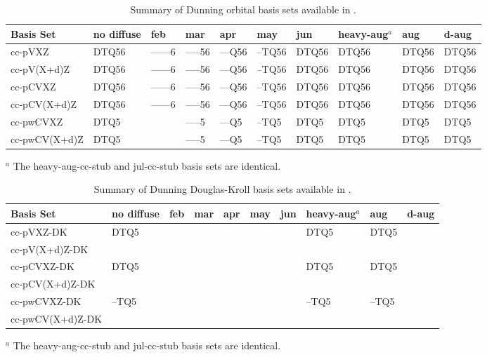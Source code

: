 \begin{table}[!htbp]
\begin{footnotesize}
\caption{Summary of Dunning orbital basis sets available in \PSIfour.} \label{table:basisDunningOrbital}
\parsep 10pt
\begin{center}
\begin{tabular}{llllllllll} 
\hline\hline
Basis Set            & no diffuse & feb & mar & apr & may & jun & heavy-aug$^a$ & aug & d-aug \\
\hline
cc-pVXZ              & DTQ56 & --{}--{}--{}--6 & --{}--{}--56 & --{}--Q56 & --TQ56 & DTQ56 & DTQ56 & DTQ56 & DTQ56 \\
cc-pV(X+d)Z          & DTQ56 & --{}--{}--{}--6 & --{}--{}--56 & --{}--Q56 & --TQ56 & DTQ56 & DTQ56 & DTQ56 & DTQ56 \\
cc-pCVXZ             & DTQ56 & --{}--{}--{}--6 & --{}--{}--56 & --{}--Q56 & --TQ56 & DTQ56 & DTQ56 & DTQ56 & DTQ56 \\
cc-pCV(X+d)Z         & DTQ56 & --{}--{}--{}--6 & --{}--{}--56 & --{}--Q56 & --TQ56 & DTQ56 & DTQ56 & DTQ56 & DTQ56 \\
cc-pwCVXZ            & DTQ5  &                 & --{}--{}--5  & --{}--Q5  & --TQ5  & DTQ5  & DTQ5  & DTQ5  & DTQ5  \\
cc-pwCV(X+d)Z        & DTQ5  &                 & --{}--{}--5  & --{}--Q5  & --TQ5  & DTQ5  & DTQ5  & DTQ5  & DTQ5  \\
\hline\hline
\end{tabular}
\end{center}
$^a$ The heavy-aug-cc-stub and jul-cc-stub basis sets are identical.
\end{footnotesize}
\end{table}


\begin{table}[!htbp]
\begin{footnotesize}
\caption{Summary of Dunning Douglas-Kroll basis sets available in \PSIfour.} \label{table:basisDunningDK}
\parsep 10pt
\begin{center}
\begin{tabular}{llllllllll}
\hline\hline
Basis Set            & no diffuse & feb & mar & apr & may & jun & heavy-aug$^a$ & aug & d-aug \\
\hline
cc-pVXZ-DK           & DTQ5  &  &  &  &  &  & DTQ5  & DTQ5  &  \\
cc-pV(X+d)Z-DK       \\
cc-pCVXZ-DK          & DTQ5  &  &  &  &  &  & DTQ5  & DTQ5  &  \\
cc-pCV(X+d)Z-DK      \\
cc-pwCVXZ-DK         & --TQ5 &  &  &  &  &  & --TQ5 & --TQ5 &  \\
cc-pwCV(X+d)Z-DK     \\
\hline\hline
\end{tabular}
\end{center}
$^a$ The heavy-aug-cc-stub and jul-cc-stub basis sets are identical.
\end{footnotesize}
\end{table}


